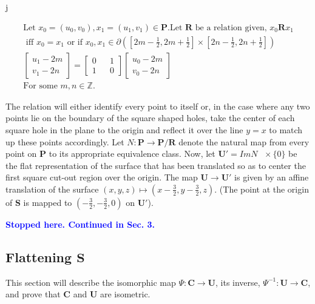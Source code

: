 j\documentclass[]{article}
\newcommand{\compav}[1]{\textbf{\textcolor{blue}{#1}}}
\begin{document}
\begin{gather*}
\text{Let } x_{0}=(u_{0},v_{0}),x_{1}=(u_{1},v_{1}) \in \mathbf{P}. \text{Let } \mathbf{R} \text { be a relation given, } x_{0}\mathbf{R}x_{1} \\ \text{ iff } x_{0}=x_{1}
 \text{ or if }x_{0},x_{1} \in {\partial} \left( \left[2m-\frac{1}{2},2m+\frac{1}{2}\right] \times \left[2n-\frac{1}{2},2n+\frac{1}{2}\right] \right)\\
  \left[\begin{array}{c}
u_{1} -2m
\\v_{1}-2n
\end{array}\right] = \left[\begin{matrix}
0 && 1\\
1 && 0
\end{matrix}\right]
\left[ \begin{array}{c}u_{0}-2m\\
v_{0}-2n
\end{array}\right]
\\\text{For some }m,n\in\mathbb{Z}. \end{gather*}

The relation will either identify every point to itself or, in the case where any two points lie on the boundary of the square shaped holes, take the center of each square hole in the plane to the origin and reflect it over the line $y=x$ to match up these points accordingly.  Let $N: \mathbf{P} \rightarrow \mathbf{P}/\mathbf{R}$ denote the natural map from every point on $\mathbf{P}$ to its appropriate equivalence class. Now, let $\mathbf{U}' = Im N \text{ }\times\{0\}$ be the flat representation of the surface that has been translated so as to center the first square cut-out region over the origin. The map $\mathbf{U}\rightarrow\mathbf{U}'$ is given by an affine translation of the surface $(x,y,z) \mapsto (x-\frac{3}{2},y-\frac{3}{2},z)$. (The point at the origin of $\mathbf{S}$ is mapped to $(-\frac{3}{2},-\frac{3}{2},0) \text{ on } \mathbf{U}'$).

\compav{Stopped here. Continued in Sec. 3.}

\newpage
\subsection{Flattening $\mathbf{S}$}
This section will describe the isomorphic map $\Psi:\mathbf{C}\rightarrow\mathbf{U}$, its inverse, $\Psi^{-1}:\mathbf{U}\rightarrow\mathbf{C}$, and prove that $\mathbf{C}$ and $\mathbf{U}$ are isometric.
\end{document}
